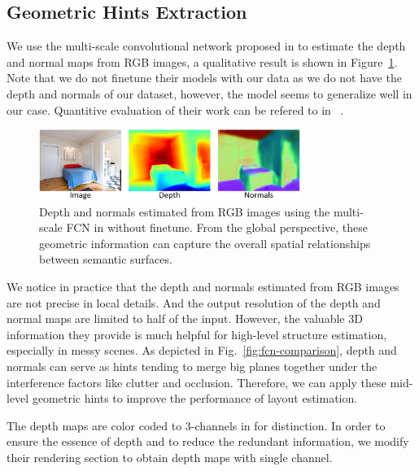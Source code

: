 \subsection{Geometric Hints Extraction}
\label{sec:depth_normal}

We use the multi-scale convolutional network proposed in \cite{eigen2015predicting} to estimate the depth and normal maps from RGB images, a qualitative result is shown in Figure~\ref{fig:depthandnormal}. Note that we do not finetune their models with our data as we do not have the depth and normals of our dataset, however, the model seems to generalize well in our case. Quantitive evaluation of their work can be refered to in ~\cite{eigen2015predicting}.
%

\begin{figure}
	\centering
	\includegraphics[width=8.5cm]{figure/DN.png}
	\caption{Depth and normals estimated from RGB images using the multi-scale FCN in \cite{eigen2015predicting} without finetune. From the global perspective, these geometric information can capture the overall spatial relationships between semantic surfaces. }
	\label{fig:depthandnormal}
\end{figure}

We notice in practice that the depth and normals estimated from RGB images are not precise in local details. And the output resolution of the depth and normal maps are limited to half of the input. However, the valuable 3D information they provide is much helpful for high-level structure estimation, especially in messy scenes.  
%
As depicted in Fig.~\ref{fig:fcn-comparison}, depth and normals can serve as hints tending to merge big planes together under the interference factors like clutter and occlusion. 
%
Therefore, we can apply these mid-level geometric hints to improve the performance of layout estimation. 
%


The depth maps are color coded to 3-channels in \cite{eigen2015predicting} for distinction. In order to ensure the essence of depth and to reduce the redundant information, we modify their rendering section to obtain depth maps with single channel.

